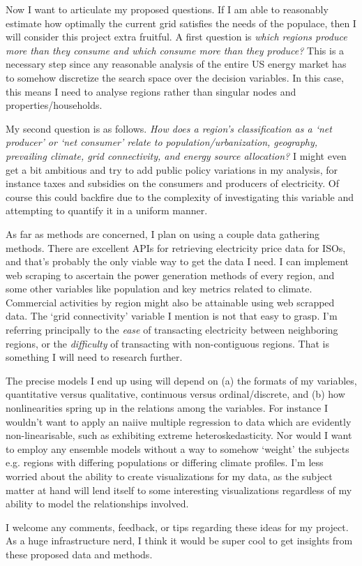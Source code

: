 \documentclass{article}
\begin{document}
\par Now I want to articulate my proposed questions. 
If I am able to reasonably estimate how optimally the current grid satisfies the needs of the populace, then I will consider this project extra fruitful. 
A first question is \textit{which regions produce more than they consume and which consume more than they produce?} 
This is a necessary step since any reasonable analysis of the entire US energy market has to somehow discretize the search space over the decision variables. 
In this case, this means I need to analyse regions rather than singular nodes and properties/households. 

\par My second question is as follows. 
\textit{How does a region's classification as a `net producer' or `net consumer' relate to population/urbanization, geography, prevailing climate, grid connectivity, and energy source allocation?}
I might even get a bit ambitious and try to add public policy variations in my analysis, for instance taxes and subsidies on the consumers and producers of electricity. 
Of course this could backfire due to the complexity of investigating this variable and attempting to quantify it in a uniform manner. 

\par As far as methods are concerned, I plan on using a couple data gathering methods. 
There are excellent APIs for retrieving electricity price data for ISOs, and that's probably the only viable way to get the data I need. 
I can implement web scraping to ascertain the power generation methods of every region, and some other variables like population and key metrics related to climate. 
Commercial activities by region might also be attainable using web scrapped data. 
The `grid connectivity' variable I mention is not that easy to grasp. 
I'm referring principally to the \textit{ease} of transacting electricity between neighboring regions, or the \textit{difficulty} of transacting with non-contiguous regions.
That is something I will need to research further. 

\par The precise models I end up using will depend on (a) the formats of my variables, quantitative versus qualitative, continuous versus ordinal/discrete, and (b) how nonlinearities spring up in the relations among the variables.
For instance I wouldn't want to apply an naiive multiple regression to data which are evidently non-linearisable, such as exhibiting extreme heteroskedasticity.
Nor would I want to employ any ensemble models without a way to somehow `weight' the subjects e.g. regions with differing populations or differing climate profiles. 
I'm less worried about the ability to create visualizations for my data, as the subject matter at hand will lend itself to some interesting visualizations regardless of my ability to model the relationships involved. 

\par I welcome any comments, feedback, or tips regarding these ideas for my project. As a huge infrastructure nerd, I think it would be super cool to get insights from these proposed data and methods. 
\end{document}
